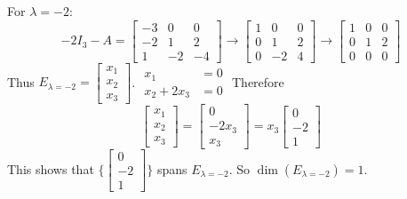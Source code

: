 \documentclass[12pt]{article}
\begin{document}
\begin{example}
For $\lambda = -2$: $$ -2I_3 - A = \begin{bmatrix} -3 & 0 & 0 \\ -2 & 1 & 2 \\ 1 & -2 & -4 \end{bmatrix} \rightarrow \begin{bmatrix} 1 & 0 & 0 \\ 0 & 1 & 2 \\ 0 & -2 & 4 \end{bmatrix} \rightarrow \begin{bmatrix} 1 & 0 & 0 \\ 0 & 1 & 2 \\ 0 & 0 & 0 \end{bmatrix} $$ Thus $E_{\lambda = -2} = \begin{bmatrix} x_1 \\ x_2 \\ x_3 \end{bmatrix}$. $\begin{aligned} x_1 &= 0 \\ x_2 + 2x_3 &= 0 \end{aligned}$  Therefore $$\begin{bmatrix} x_1 \\ x_2 \\ x_3 \end{bmatrix} = \begin{bmatrix} 0 \\ -2x_3 \\ x_3 \end{bmatrix} = x_3\begin{bmatrix} 0 \\ -2 \\ 1 \end{bmatrix} $$ This shows that $\{\begin{bmatrix} 0 \\ -2 \\ 1 \end{bmatrix}\}$ spans $E_{\lambda = -2}$.  So $\dim(E_{\lambda = -2}) = 1$. \end{example} 
\end{document}
